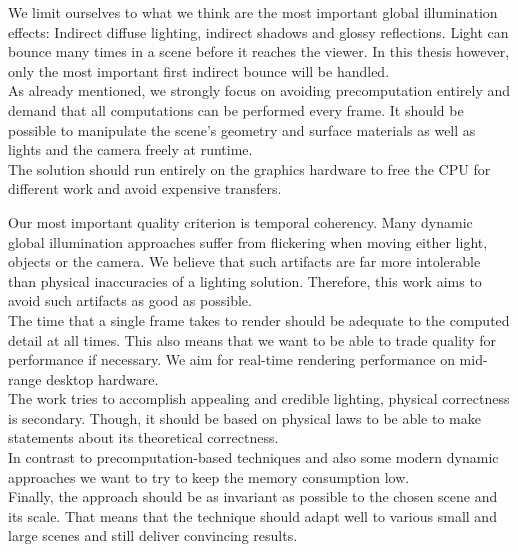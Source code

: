 \documentclass[thesis.tex]{subfiles}
\begin{document}
We limit ourselves to what we think are the most important global illumination effects: Indirect diffuse lighting, indirect shadows and glossy reflections.
Light can bounce many times in a scene before it reaches the viewer.
In this thesis however, only the most important first indirect bounce will be handled.
\\
As already mentioned, we strongly focus on avoiding precomputation entirely and demand that all computations can be performed every frame.
It should be possible to manipulate the scene's geometry and surface materials as well as lights and the camera freely at runtime.
\\
The solution should run entirely on the graphics hardware to free the CPU for different work and avoid expensive transfers.

Our most important quality criterion is temporal coherency.
Many dynamic global illumination approaches suffer from flickering when moving either light, objects or the camera.
We believe that such artifacts are far more intolerable than physical inaccuracies of a lighting solution.
Therefore, this work aims to avoid such artifacts as good as possible.
\\
The time that a single frame takes to render should be adequate to the computed detail at all times.
This also means that we want to be able to trade quality for performance if necessary.
We aim for real-time rendering performance on mid-range desktop hardware.
\\
The work tries to accomplish appealing and credible lighting, physical correctness is secondary.
Though, it should be based on physical laws to be able to make statements about its theoretical correctness.
\\
In contrast to precomputation-based techniques and also some modern dynamic approaches we want to try to keep the memory consumption low.
\\
Finally, the approach should be as invariant as possible to the chosen scene and its scale. %
That means that the technique should adapt well to various small and large scenes and still deliver convincing results.

\end{document}
